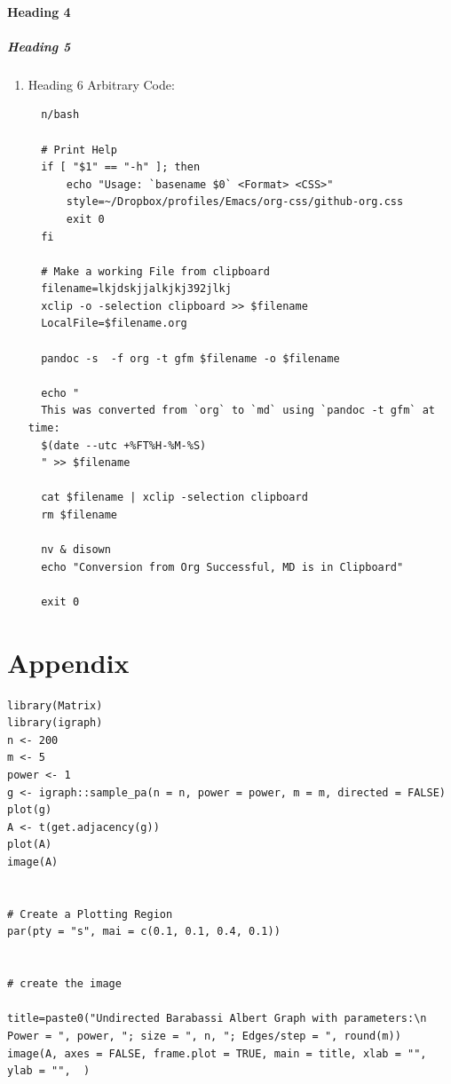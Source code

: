 \documentclass[11pt]{article}
\begin{document}
\paragraph{Heading 4}
\label{heading-4}
\subparagraph{Heading 5}
\label{heading-5}
\begin{enumerate}
\item Heading 6
\label{heading-6}
Arbitrary Code:

\lstset{language=sh,label= ,caption= ,captionpos=b,numbers=none}
\begin{lstlisting}
  n/bash

  # Print Help
  if [ "$1" == "-h" ]; then
      echo "Usage: `basename $0` <Format> <CSS>"
      style=~/Dropbox/profiles/Emacs/org-css/github-org.css
      exit 0
  fi

  # Make a working File from clipboard
  filename=lkjdskjjalkjkj392jlkj
  xclip -o -selection clipboard >> $filename
  LocalFile=$filename.org

  pandoc -s  -f org -t gfm $filename -o $filename

  echo "
  This was converted from `org` to `md` using `pandoc -t gfm` at time:
  $(date --utc +%FT%H-%M-%S)
  " >> $filename

  cat $filename | xclip -selection clipboard
  rm $filename

  nv & disown
  echo "Conversion from Org Successful, MD is in Clipboard"

  exit 0
\end{lstlisting}
\end{enumerate}
\section{Appendix}
\label{sec:orgdb68a95}

\begin{lstlisting}
library(Matrix)
library(igraph)
n <- 200
m <- 5
power <- 1
g <- igraph::sample_pa(n = n, power = power, m = m, directed = FALSE)
plot(g)
A <- t(get.adjacency(g))
plot(A)
image(A)


# Create a Plotting Region
par(pty = "s", mai = c(0.1, 0.1, 0.4, 0.1))


# create the image

title=paste0("Undirected Barabassi Albert Graph with parameters:\n Power = ", power, "; size = ", n, "; Edges/step = ", round(m))
image(A, axes = FALSE, frame.plot = TRUE, main = title, xlab = "", ylab = "",  )
\end{lstlisting}
\end{document}
